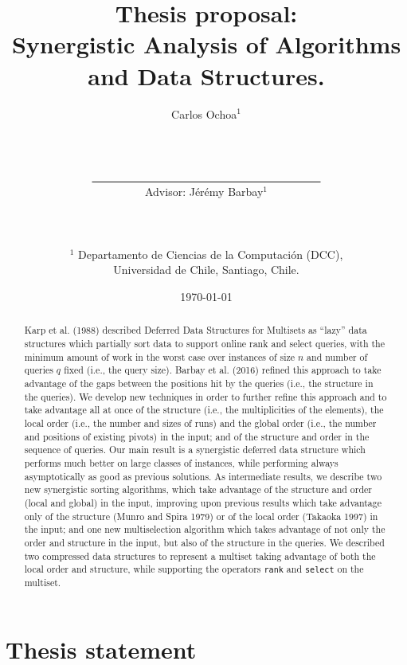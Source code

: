\documentclass[10pt]{article}
\title{Thesis proposal: \\Synergistic Analysis of Algorithms and Data Structures.}
\author{Carlos Ochoa$^{1}$
  \\\\\\\\\underline{\ \ \ \ \ \ \ \ \ \ \ \ \ \ \ \ \ \ \ \ \ \ \ \ \
    \ \ \ \ \ \ \ \ \ \ \ \ \ \ \ \ }
  \\Advisor: J\'er\'emy Barbay$^1$\\\\\\\\
  $^1$ Departamento de Ciencias de la Computaci\'on (DCC),\\ Universidad de Chile, Santiago, Chile.
}
\date{\today}
\begin{document}
\maketitle
\begin{abstract}
  Karp et al. (1988) described Deferred Data Structures for Multisets
  as ``lazy'' data structures which partially sort data to support
  online rank and select queries, with the minimum amount of work in
  the worst case over instances of size $n$ and number of queries $q$
  fixed (i.e., the query size). Barbay et al. (2016) refined this
  approach to take advantage of the gaps between the positions hit by
  the queries (i.e., the structure in the queries). We develop new
  techniques in order to further refine this approach and to take
  advantage all at once of the structure (i.e., the multiplicities of
  the elements), the local order (i.e., the number and sizes of runs)
  and the global order (i.e., the number and positions of existing
  pivots) in the input; and of the structure and order in the sequence
  of queries. Our main result is a synergistic deferred data structure
  which performs much better on large classes of instances, while
  performing always asymptotically as good as previous solutions. As
  intermediate results, we describe two new synergistic sorting
  algorithms, which take advantage of the structure and order (local
  and global) in the input, improving upon previous results which take
  advantage only of the structure (Munro and Spira 1979) or of the
  local order (Takaoka 1997) in the input; and one new multiselection
  algorithm which takes advantage of not only the order and structure
  in the input, but also of the structure in the queries.  We
  described two compressed data structures to represent a multiset
  taking advantage of both the local order and structure, while
  supporting the operators \texttt{rank} and \texttt{select} on the
  multiset.
\end{abstract}
\clearpage

\section{Thesis statement}
\end{document}

